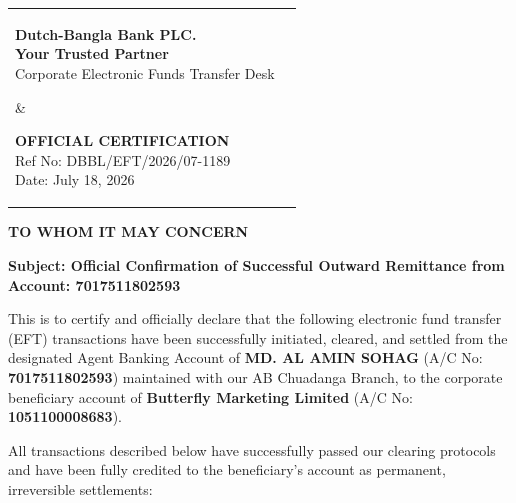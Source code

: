 \documentclass[10pt, a4paper]{article}
\begin{document}
\noindent
\begin{tabularx}{\textwidth}{@{}X r@{}}
    \parbox[b]{11cm}{
        {\fontsize{18}{22}\selectfont \textbf{\textcolor{dbblgreen}{Dutch-Bangla Bank PLC.}}} \\
        \fontsize{8}{10}\selectfont \textcolor{dbblblue}{\textbf{Your Trusted Partner}} \\
        \fontsize{8}{10}\selectfont Corporate Electronic Funds Transfer Desk
    } & 
    \parbox[b]{5.5cm}{\raggedleft
        \textcolor{textdark}{\textbf{OFFICIAL CERTIFICATION}} \\
        \fontsize{8}{10}\selectfont Ref No: DBBL/EFT/2026/07-1189 \\
        \fontsize{8}{10}\selectfont Date: July 18, 2026
    }
\end{tabularx}

\vspace{8mm}

\noindent
\textbf{TO WHOM IT MAY CONCERN}

\vspace{5mm}

\noindent
\textbf{Subject: Official Confirmation of Successful Outward Remittance from Account: 7017511802593}

\vspace{3mm}

\noindent
This is to certify and officially declare that the following electronic fund transfer (EFT) transactions have been successfully initiated, cleared, and settled from the designated Agent Banking Account of \textbf{MD. AL AMIN SOHAG} (A/C No: \textbf{7017511802593}) maintained with our AB Chuadanga Branch, to the corporate beneficiary account of \textbf{Butterfly Marketing Limited} (A/C No: \textbf{1051100008683}).

\vspace{3mm}
\noindent
All transactions described below have successfully passed our clearing protocols and have been fully credited to the beneficiary's account as permanent, irreversible settlements:
\end{document}
